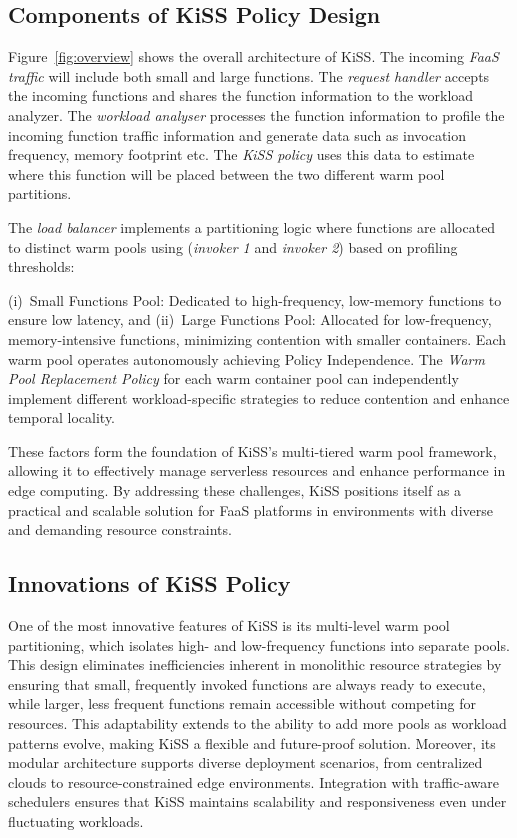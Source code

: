 \subsection{Components of KiSS Policy Design}
Figure~\ref{fig:overview} shows the overall architecture of KiSS. 
The incoming \textit{FaaS traffic} will include both small and large functions. 
The \textit{request handler} accepts the incoming functions and shares the function information to the workload analyzer. 
The \textit{workload analyser} processes the function information to profile the incoming function traffic information and generate data such as invocation frequency, memory footprint etc.
The \textit{KiSS policy} uses this data to estimate where this function will be placed between the two different warm pool partitions.

The \textit{load balancer} implements a partitioning logic where functions are allocated to distinct warm pools using (\textit{invoker 1} and \textit{invoker 2}) based on profiling thresholds:

(i)~Small Functions Pool: Dedicated to high-frequency, low-memory functions to ensure low latency, and (ii)~Large Functions Pool: Allocated for low-frequency, memory-intensive functions, minimizing contention with smaller containers.
Each warm pool operates autonomously achieving Policy Independence.
The \textit{Warm Pool Replacement Policy} for each warm container pool can independently implement different workload-specific strategies to reduce contention and enhance temporal locality.


These factors form the foundation of KiSS’s multi-tiered warm pool framework, allowing it to effectively manage serverless resources and enhance performance in edge computing. By addressing these challenges, KiSS positions itself as a practical and scalable solution for FaaS platforms in environments with diverse and demanding resource constraints.


\subsection{Innovations of KiSS Policy}

One of the most innovative features of KiSS is its multi-level warm pool partitioning, which isolates high- and low-frequency functions into separate pools. This design eliminates inefficiencies inherent in monolithic resource strategies by ensuring that small, frequently invoked functions are always ready to execute, while larger, less frequent functions remain accessible without competing for resources. This adaptability extends to the ability to add more pools as workload patterns evolve, making KiSS a flexible and future-proof solution. Moreover, its modular architecture supports diverse deployment scenarios, from centralized clouds to resource-constrained edge environments. Integration with traffic-aware schedulers ensures that KiSS maintains scalability and responsiveness even under fluctuating workloads.


